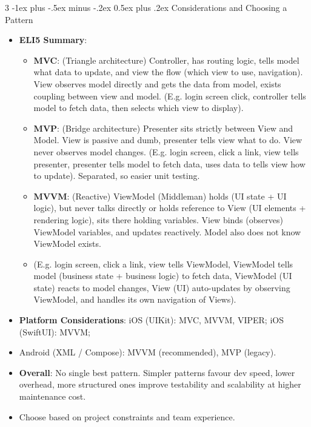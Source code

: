 \documentclass[a4paper, 9pt, landscape]{extarticle}
\makeatletter
\renewcommand{\subsection}{\@startsection{subsubsection}{3}{0mm}%
                                {-1ex plus -.5ex minus -.2ex}%
                                {0.5ex plus .2ex}%
                                {\normalfont\small\bfseries}}
\makeatother
\begin{document}
\begin{multicols*}{3}
\subsection{Considerations and Choosing a Pattern}
\begin{itemize}
  \item \textbf{ELI5 Summary}: 
    \begin{itemize}
      \item \textbf{MVC}: (Triangle architecture) Controller, has routing logic, tells model what data to update, and view the flow (which view to use, navigation). View observes model directly and gets the data from model, exists coupling between view and model. (E.g. login screen click, controller tells model to fetch data, then selects which view to display).
      \item \textbf{MVP}: (Bridge architecture) Presenter sits strictly between View and Model. View is passive and dumb, presenter tells view what to do. View never observes model changes. (E.g. login screen, click a link, view tells presenter, presenter tells model to fetch data, uses data to tells view how to update). Separated, so easier unit testing.
      \item \textbf{MVVM}: (Reactive) ViewModel (Middleman) holds (UI state + UI logic), but never talks directly or holds reference to View (UI elements + rendering logic), sits there holding variables. View binds (observes) ViewModel variables, and updates reactively. Model also does not know ViewModel exists. 
      \item (E.g. login screen, click a link, view tells ViewModel, ViewModel tells model (business state + business logic) to fetch data, ViewModel (UI state) reacts to model changes, View (UI) auto-updates by observing ViewModel, and handles its own navigation of Views).
    \end{itemize}
   
  \item \textbf{Platform Considerations}: iOS (UIKit): MVC, MVVM, VIPER; iOS (SwiftUI): MVVM; 
  \item Android (XML / Compose): MVVM (recommended), MVP (legacy).
  \item \textbf{Overall}: No single best pattern. Simpler patterns favour dev speed, lower overhead, more structured ones improve testability and scalability at higher maintenance cost.
  \item Choose based on project constraints and team experience.
\end{itemize}



\end{multicols*}
\end{document}

